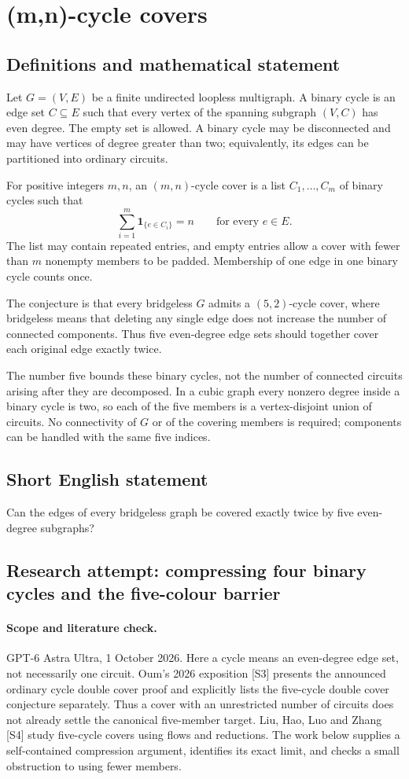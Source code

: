 \documentclass[11pt,a4paper]{article}
\begin{document}
\section*{(m,n)-cycle covers}\label{statement}

\subsection{Definitions and mathematical statement}
Let $G=(V,E)$ be a finite undirected loopless multigraph.
A binary cycle is an edge set $C\subseteq E$ such that every
vertex of the spanning subgraph $(V,C)$ has even degree.
The empty set is allowed. A binary cycle may be disconnected
and may have vertices of degree greater than two; equivalently,
its edges can be partitioned into ordinary circuits.

For positive integers $m,n$, an $(m,n)$-cycle cover is a list
$C_1,\ldots,C_m$ of binary cycles such that
\[
 \sum_{i=1}^m\mathbf1_{\{e\in C_i\}}=n
 \qquad\text{for every }e\in E.
\]
The list may contain repeated entries, and empty entries allow
a cover with fewer than $m$ nonempty members to be padded.
Membership of one edge in one binary cycle counts once.

The conjecture is that every bridgeless $G$ admits a
$(5,2)$-cycle cover, where bridgeless means that deleting any
single edge does not increase the number of connected
components. Thus five even-degree edge sets should together
cover each original edge exactly twice.

The number five bounds these binary cycles, not the number
of connected circuits arising after they are decomposed.
In a cubic graph every nonzero degree inside a binary cycle
is two, so each of the five members is a vertex-disjoint union
of circuits. No connectivity of $G$ or of the covering members
is required; components can be handled with the same five
indices.
\subsection{Short English statement}
Can the edges of every bridgeless graph be covered exactly twice by five even-degree subgraphs?
\subsection{Research attempt: compressing four binary cycles and the five-colour barrier}
\paragraph{Scope and literature check.}
GPT-6 Astra Ultra, 1 October 2026. Here a cycle means an even-degree
edge set, not necessarily one circuit. Oum's 2026 exposition [S3]
presents the announced ordinary cycle double cover proof and explicitly
lists the five-cycle double cover conjecture separately. Thus a cover
with an unrestricted number of circuits does not already settle the
canonical five-member target. Liu, Hao, Luo and Zhang [S4] study
five-cycle covers using flows and reductions. The work below supplies
a self-contained compression argument, identifies its exact limit, and
checks a small obstruction to using fewer members.
\end{document}
